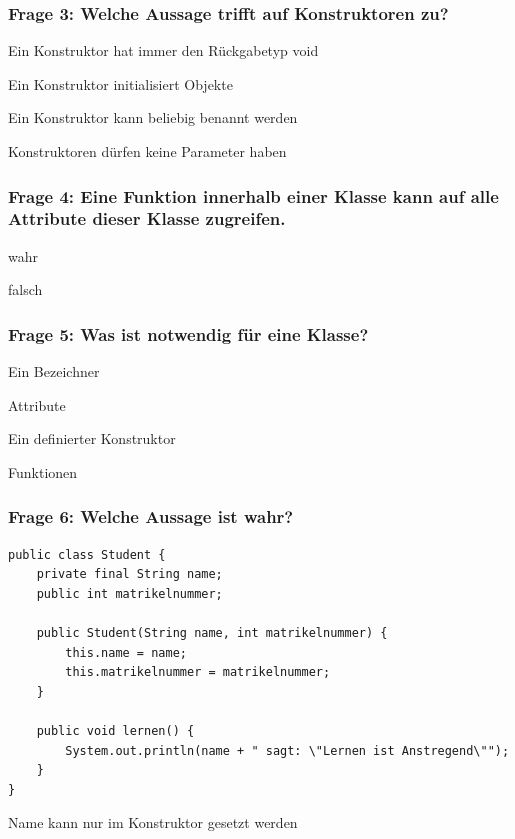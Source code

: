 \documentclass{../../presentation}
\begin{document}
\begin{frame}[fragile]
	\frametitle{Frage 3: Welche Aussage trifft auf Konstruktoren zu?}
	\begin{ausgabe}
		Ein Konstruktor hat immer den Rückgabetyp void
	\end{ausgabe}
	\begin{ausgabe}
		\textcolor<2->{green!100!black}{Ein Konstruktor initialisiert Objekte}
	\end{ausgabe}
	\begin{ausgabe}
		Ein Konstruktor kann beliebig benannt werden
	\end{ausgabe}
	\begin{ausgabe}
		Konstruktoren dürfen keine Parameter haben
	\end{ausgabe}
\end{frame}

\begin{frame}[fragile]
	\frametitle{Frage 4: Eine Funktion innerhalb einer Klasse kann auf alle Attribute dieser Klasse zugreifen.}

	\begin{ausgabe}
		\textcolor<2->{green!100!black}{wahr}
	\end{ausgabe}

	\begin{ausgabe}
		falsch
	\end{ausgabe}
\end{frame}

\begin{frame}[fragile]
	\frametitle{Frage 5: Was ist notwendig für eine Klasse?}
	\begin{ausgabe}
		\textcolor<2->{green!100!black}{Ein Bezeichner}
	\end{ausgabe}
	\begin{ausgabe}
		Attribute
	\end{ausgabe}
	\begin{ausgabe}
		Ein definierter Konstruktor
	\end{ausgabe}
	\begin{ausgabe}
		Funktionen
	\end{ausgabe}
\end{frame}

\begin{frame}[fragile]
	\frametitle{Frage 6: Welche Aussage ist wahr?}
	\begin{verbatim}
public class Student {
    private final String name;
    public int matrikelnummer;

    public Student(String name, int matrikelnummer) {
        this.name = name;
        this.matrikelnummer = matrikelnummer;
    }

    public void lernen() {
        System.out.println(name + " sagt: \"Lernen ist Anstregend\"");
    }
}
	\end{verbatim}
	\begin{ausgabe}
		\textcolor{green!100!black}{Name kann nur im Konstruktor gesetzt werden}
	\end{ausgabe}
\end{frame}
\end{document}
